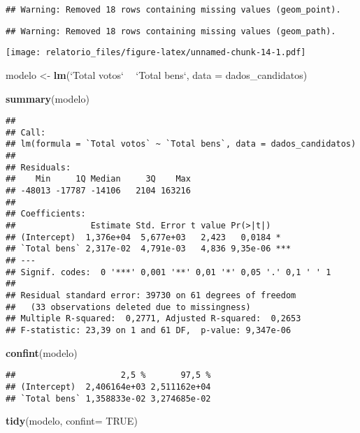 \documentclass[]{article}
\newenvironment{Shaded}{\begin{snugshade}}{\end{snugshade}}
\newcommand{\KeywordTok}[1]{\textcolor[rgb]{0.13,0.29,0.53}{\textbf{#1}}}
\newcommand{\DataTypeTok}[1]{\textcolor[rgb]{0.13,0.29,0.53}{#1}}
\newcommand{\StringTok}[1]{\textcolor[rgb]{0.31,0.60,0.02}{#1}}
\newcommand{\OtherTok}[1]{\textcolor[rgb]{0.56,0.35,0.01}{#1}}
\newcommand{\OperatorTok}[1]{\textcolor[rgb]{0.81,0.36,0.00}{\textbf{#1}}}
\newcommand{\NormalTok}[1]{#1}
\begin{document}
\begin{verbatim}
## Warning: Removed 18 rows containing missing values (geom_point).
\end{verbatim}

\begin{verbatim}
## Warning: Removed 18 rows containing missing values (geom_path).
\end{verbatim}

\texttt{[image: relatorio\_files/figure-latex/unnamed-chunk-14-1.pdf]}

\begin{Shaded}
\begin{Highlighting}[]
\NormalTok{modelo <-}\StringTok{ }\KeywordTok{lm}\NormalTok{(}\StringTok{`}\DataTypeTok{Total votos}\StringTok{`} \OperatorTok{~}\StringTok{ `}\DataTypeTok{Total bens}\StringTok{`}\NormalTok{, }\DataTypeTok{data =}\NormalTok{ dados_candidatos)}
  
  \KeywordTok{summary}\NormalTok{(modelo)}
\end{Highlighting}
\end{Shaded}

\begin{verbatim}
## 
## Call:
## lm(formula = `Total votos` ~ `Total bens`, data = dados_candidatos)
## 
## Residuals:
##    Min     1Q Median     3Q    Max 
## -48013 -17787 -14106   2104 163216 
## 
## Coefficients:
##               Estimate Std. Error t value Pr(>|t|)    
## (Intercept)  1,376e+04  5,677e+03   2,423   0,0184 *  
## `Total bens` 2,317e-02  4,791e-03   4,836 9,35e-06 ***
## ---
## Signif. codes:  0 '***' 0,001 '**' 0,01 '*' 0,05 '.' 0,1 ' ' 1
## 
## Residual standard error: 39730 on 61 degrees of freedom
##   (33 observations deleted due to missingness)
## Multiple R-squared:  0,2771, Adjusted R-squared:  0,2653 
## F-statistic: 23,39 on 1 and 61 DF,  p-value: 9,347e-06
\end{verbatim}

\begin{Shaded}
\begin{Highlighting}[]
  \KeywordTok{confint}\NormalTok{(modelo)}
\end{Highlighting}
\end{Shaded}

\begin{verbatim}
##                     2,5 %       97,5 %
## (Intercept)  2,406164e+03 2,511162e+04
## `Total bens` 1,358833e-02 3,274685e-02
\end{verbatim}

\begin{Shaded}
\begin{Highlighting}[]
  \KeywordTok{tidy}\NormalTok{(modelo, }\DataTypeTok{confint=} \OtherTok{TRUE}\NormalTok{)}
\end{Highlighting}
\end{Shaded}
\end{document}
